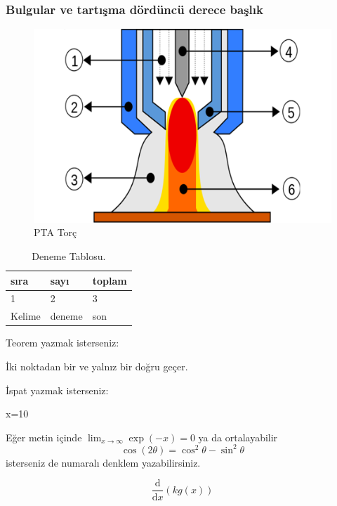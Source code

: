 \subsubsection{Bulgular ve tartışma dördüncü derece başlık}
\lipsum[1-2]
\begin{figure}[h]
\centering
\includegraphics[width=\textwidth]{gorseller/ptaTorc}
\caption{PTA Torç}\label{fig:PtaTorc1}
\end{figure}
\lipsum[1-2]
\begin{table}
\centering
\caption{Deneme Tablosu.}\label{tab:den1}
\begin{tabular}{|l|l|l|}
\hline
sıra   & sayı   & toplam \\ \hline
1      & 2      & 3      \\ \hline
Kelime & deneme & son    \\ \hline
\end{tabular}
\end{table}

Teorem yazmak isterseniz:
\begin{theorem}[Öklid]
 İki noktadan bir ve yalnız bir doğru geçer.
\end{theorem}

İspat yazmak isterseniz:
\begin{ispat}
x=10
\end{ispat}
Eğer metin içinde \(\lim_{x \to \infty} \exp(-x) = 0\) ya da ortalayabilir
\begin{displaymath}
\cos (2\theta) = \cos^2 \theta - \sin^2 \theta
\end{displaymath}
isterseniz de numaralı denklem yazabilirsiniz.

\begin{equation}
\frac{\mathrm d}{\mathrm d x} \left( k g(x) \right)
\end{equation}
